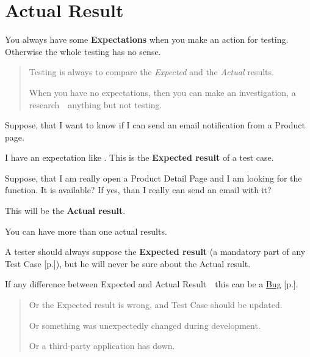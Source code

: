 \section{Actual Result}
\label{sec:Actual Result}

You always have some \textbf{Expectations} when you make an action for testing. Otherwise the whole testing has no sense.

\begin{quote}
Testing is always to compare the \emph{Expected} and the \emph{Actual} results.

When you have no expectations, then you can make an investigation, a research~\textemdash~anything but not testing.
\end{quote}

Suppose, that I want to know if I can send an email notification from a Product page.

I have an expectation like . This is the \textbf{Expected result} of a test case.

Suppose, that I am really open a Product Detail Page and I am looking for the  function. It is available? If yes, than I really can send an email with it? 

This will be the \textbf{Actual result}.

You can have more than one actual results.

A tester should always suppose the \textbf{Expected result} (a mandatory part of any Test Case [p.\pageref{sec:Test Case}]), but he will never be sure about the Actual result.

If any difference between Expected and Actual Result~\textemdash~this can be a \hyperref[sec:Bug]{Bug} [p.\pageref{sec:Bug}].

\begin{quote}
Or the Expected result is wrong, and Test Case should be updated.

Or something was unexpectedly changed during development.

Or a third-party application has down. 
\end{quote} 
